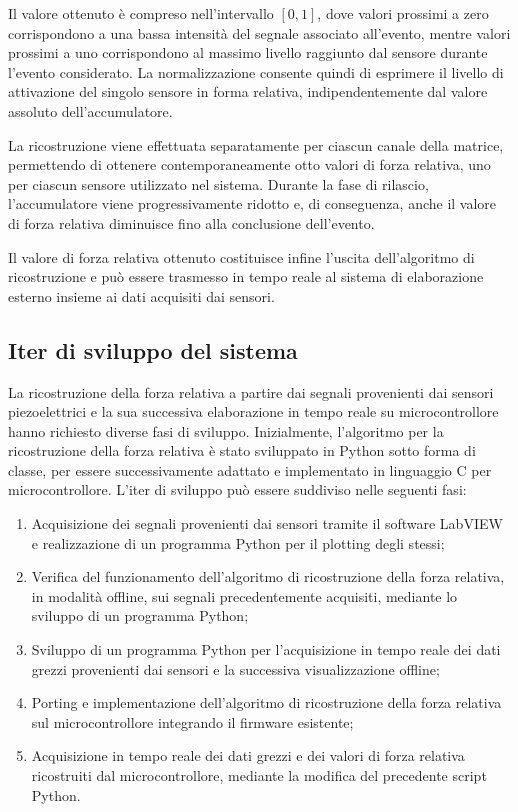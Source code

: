 \documentclass[10pt, a4paper]{article}
\begin{document}
                Il valore ottenuto è compreso nell'intervallo $[0,1]$, dove valori prossimi a zero corrispondono a una bassa intensità del segnale associato all'evento, mentre valori prossimi a 
                uno corrispondono al massimo livello raggiunto dal sensore durante l'evento considerato. La normalizzazione consente quindi di esprimere il livello di attivazione del singolo sensore 
                in forma relativa, indipendentemente dal valore assoluto dell'accumulatore.

                La ricostruzione viene effettuata separatamente per ciascun canale della matrice, permettendo di ottenere contemporaneamente otto valori di forza relativa, uno per ciascun sensore 
                utilizzato nel sistema. Durante la fase di rilascio, l'accumulatore viene progressivamente ridotto e, di conseguenza, anche il valore di forza relativa diminuisce fino alla conclusione
                dell'evento.

                Il valore di forza relativa ottenuto costituisce infine l'uscita dell'algoritmo di ricostruzione e può essere trasmesso in tempo reale al sistema di elaborazione esterno insieme ai 
                dati acquisiti dai sensori.

        \subsection{Iter di sviluppo del sistema}
            La ricostruzione della forza relativa a partire dai segnali provenienti dai sensori piezoelettrici e la sua successiva elaborazione in tempo reale su microcontrollore hanno
            richiesto diverse fasi di sviluppo. Inizialmente, l'algoritmo per la ricostruzione della forza relativa è stato sviluppato in Python sotto forma di classe, per essere successivamente 
            adattato e implementato in linguaggio C per microcontrollore.
            L'iter di sviluppo può essere suddiviso nelle seguenti fasi:

            \begin{enumerate}
                \item Acquisizione dei segnali provenienti dai sensori tramite il software LabVIEW e realizzazione di un programma Python per il plotting degli stessi;
                \item Verifica del funzionamento dell'algoritmo di ricostruzione della forza relativa, in modalità offline, sui segnali precedentemente acquisiti, mediante lo sviluppo di un programma Python;
                \item Sviluppo di un programma Python per l'acquisizione in tempo reale dei dati grezzi provenienti dai sensori e la successiva visualizzazione offline;
                \item Porting e implementazione dell'algoritmo di ricostruzione della forza relativa sul microcontrollore integrando il firmware esistente;
                \item Acquisizione in tempo reale dei dati grezzi e dei valori di forza relativa ricostruiti dal microcontrollore, mediante la modifica del precedente script Python.
            \end{enumerate}
            
\end{document}
